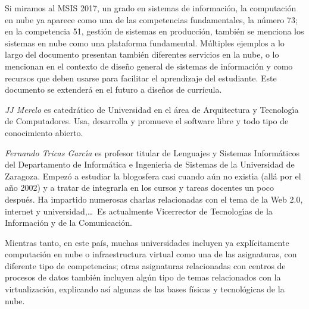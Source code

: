 \documentclass[twoside,10pt]{article}
\newcounter{num}
\begin{document}
\begin{multicols}{2}
Si miramos al MSIS 2017, un grado en sistemas de informaci\'on, la
computaci\'on en nube ya aparece como una de las competencias
fundamentales, la n\'umero 73; en la competencia 51, gesti\'on de
sistemas en producci\'on, tambi\'en se menciona los sistemas en nube como
una plataforma fundamental. M\'ultiples ejemplos a lo largo del
documento presentan tambi\'en diferentes servicios en la nube, o lo
mencionan en el contexto de dise\~no general de sistemas de
informaci\'on y como recursos que deben usarse para facilitar el
aprendizaje del estudiante. Este documento se extender\'a en el futuro a
dise\~nos de curr\'icula. 
  
\vspace{1ex} {\small{\begin{window} \noindent\emph{JJ Merelo} es catedr\'{a}tico de Universidad
en el \'area de Arquitectura y Tecnolog\'{\i}a de Computadores. Usa,
desarrolla y promueve el software libre y todo tipo de conocimiento
abierto. 
\end{window}}}

\medskip

{\small{\begin{window}
		\noindent \emph{Fernando Tricas Garc\'{\i}a} es profesor
		titular de Lenguajes y Sistemas Inform\'{a}ticos del Departamento
		de Inform\'{a}tica e Ingenier\'{\i}a de Sistemas de la Universidad de
		Zaragoza.  Empez\'{o} a estudiar la blogosfera casi cuando a\'{u}n no
		exist\'{\i}a (all\'{a} por el a\~{n}o 2002) y a tratar de integrarla en los
		cursos y tareas docentes un poco despu\'{e}s.  Ha impartido
		numerosas charlas relacionadas con el tema de la Web 2.0, 
		internet y universidad,\ldots\ 
		Es actualmente Vicerrector de Tecnolog\'{\i}as de la Informaci\'{o}n y
de la Comunicaci\'{o}n.   
		\end{window}}}

Mientras tanto, en este pa\'is, muchas universidades incluyen ya
expl\'icitamente computaci\'on en nube o infraestructura virtual como una
de las asignaturas, con diferente tipo de competencias; otras
asignaturas relacionadas con centros de procesos de datos tambi\'en
incluyen alg\'un tipo de temas relacionados con la virtualizaci\'on,
explicando as\'i algunas de las bases f\'isicas y tecnol\'ogicas de la
nube.


\end{multicols}
\end{document}
